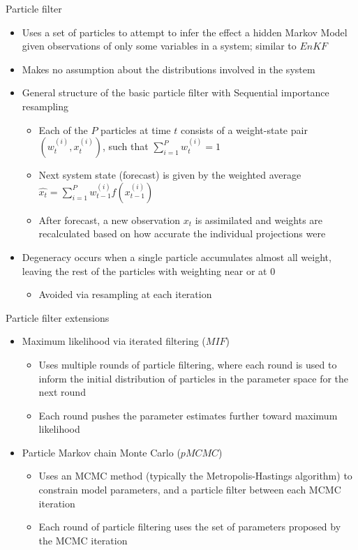 \documentclass[10pt]{beamer}
\begin{document}
		\begin{frame}{Particle filter}
			\begin{itemize}
				\item Uses a set of particles to attempt to infer the effect a hidden Markov Model given observations of only some variables in a system; similar to $EnKF$
				\item Makes no assumption about the distributions involved in the system
				\item General structure of the basic particle filter with Sequential importance resampling
				\begin{itemize}
					\item Each of the $P$ particles at time $t$ consists of a weight-state pair $(w_t^{(i)},x_t^{(i)})$, such that $\sum\limits_{i=1}^{P} w_t^{(i)} = 1$
					\item Next system state (forecast) is given by the weighted average $\hat{x_t} = \sum\limits_{i=1}^{P} w_{t-1}^{(i)} f(x_{t-1}^{(i)})$
					\item After forecast, a new observation $x_t$ is assimilated and weights are recalculated based on how accurate the individual projections were
				\end{itemize}
				\item Degeneracy occurs when a single particle accumulates almost all weight, leaving the rest of the particles with weighting near or at 0
				\begin{itemize}
					\item Avoided via resampling at each iteration
				\end{itemize}
				

			\end{itemize}
		\end{frame}

		\begin{frame}{Particle filter extensions}
			\begin{itemize}
				\item Maximum likelihood via iterated filtering ($MIF$)
					\begin{itemize}
					 	\item Uses multiple rounds of particle filtering, where each round is used to inform the initial distribution of particles in the parameter space for the next round
					 	\item Each round pushes the parameter estimates further toward maximum likelihood
					\end{itemize}
				\item Particle Markov chain Monte Carlo ($pMCMC$)
					\begin{itemize}
					 	\item Uses an MCMC method (typically the Metropolis-Hastings algorithm) to constrain model parameters, and a particle filter between each MCMC iteration
					 	\item Each round of particle filtering uses the set of parameters proposed by the MCMC iteration
					\end{itemize}

			\end{itemize}
		\end{frame}
\end{document}
